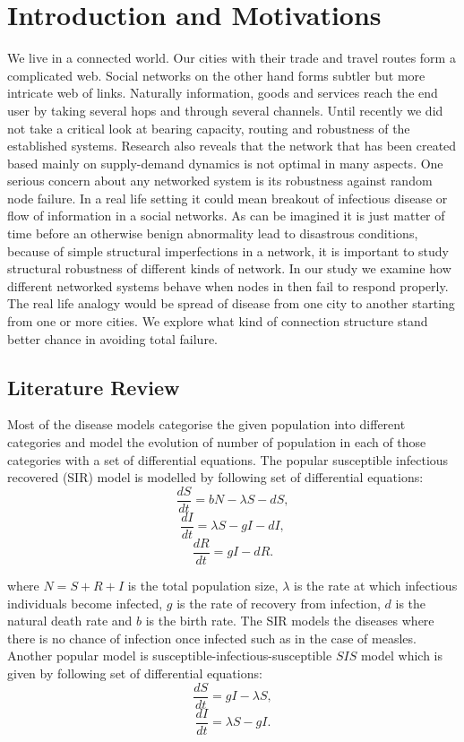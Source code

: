 \documentclass[11pt]{article}
\begin{document}
\section{Introduction and Motivations}
We live in a connected world. Our cities with their trade and travel routes form a complicated web. Social networks on the other hand forms subtler but more intricate web of links. Naturally information, goods and services reach the end user by taking several hops and through several channels. Until recently we did not take a critical look at bearing capacity, routing and robustness of the established systems. Research also reveals that the network that has been created based mainly on supply-demand dynamics is not optimal in many aspects. One serious concern about any networked system is its robustness against random node failure. In a real life setting it could mean breakout of infectious disease or flow of information in a social networks. As can be imagined it is just matter of time before an otherwise benign abnormality lead to disastrous conditions, because of simple structural imperfections in a network, it is important to study structural robustness of different kinds of network. In our study we examine how different networked systems behave when nodes in then fail to respond properly. The real life analogy would be spread of disease from one city to another starting from one or more cities. We explore what kind of connection structure stand better chance in avoiding total failure.
\subsection{Literature Review}
Most of the disease models categorise the given population into different categories and model the evolution of number of population in each of those categories with a set of differential equations. The popular susceptible infectious recovered (SIR) model is modelled by following set of differential equations:
\[ \frac{dS}{dt} = bN - \lambda S - dS,  \]
\[ \frac{dI}{dt} = \lambda S - gI - dI, \]
\[ \frac{dR}{dt} = gI - dR. \]

where $N = S + R + I$ is the total population size, $\lambda$ is the rate at which infectious individuals become infected, $g$ is the rate of recovery from infection, $d$ is the natural death rate and $b$ is the birth rate. The SIR models the diseases where there is no chance of infection once infected such as in the case of measles. Another popular model is susceptible-infectious-susceptible $SIS$ model which is given by following set of differential equations:
\[ \frac{dS}{dt} = gI - \lambda S,  \]
\[ \frac{dI}{dt} = \lambda S - gI. \]
\end{document}
